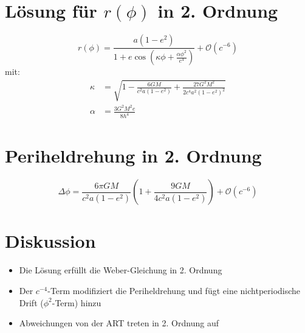 \section{Lösung für $r(\phi)$ in 2. Ordnung}
\begin{equation}
r(\phi) = \frac{a(1-e^2)}{1 + e \cos \left( \kappa \phi + \frac{\alpha \phi^2}{c^4} \right)} + \mathcal{O}(c^{-6})
\end{equation}
mit:
\begin{align}
\kappa &= \sqrt{1 - \frac{6GM}{c^2 a(1-e^2)} + \frac{27G^2M^2}{2c^4 a^2(1-e^2)^2}} \\
\alpha &= \frac{3G^2M^2 e}{8h^4}
\end{align}

\section{Periheldrehung in 2. Ordnung}
\begin{equation}
\Delta \phi = \frac{6\pi GM}{c^2 a(1-e^2)} \left( 1 + \frac{9GM}{4c^2 a(1-e^2)} \right) + \mathcal{O}(c^{-6})
\end{equation}

\section{Diskussion}
\begin{itemize}
\item Die Lösung erfüllt die Weber-Gleichung in 2. Ordnung
\item Der $c^{-4}$-Term modifiziert die Periheldrehung und fügt eine nichtperiodische Drift ($\phi^2$-Term) hinzu
\item Abweichungen von der ART treten in 2. Ordnung auf
\end{itemize}
